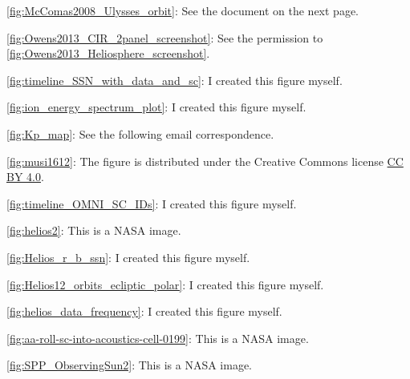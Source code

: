 \begin{itemize*}
	\item \autoref{fig:McComas2008_Ulysses_orbit}: See the document on the next page.
	
	\item \autoref{fig:Owens2013_CIR_2panel_screenshot}: See the permission to \autoref{fig:Owens2013_Heliosphere_screenshot}.

	\item \autoref{fig:timeline_SSN_with_data_and_sc}: I created this figure myself.
	\item \autoref{fig:ion_energy_spectrum_plot}: I created this figure myself.
	\item \autoref{fig:Kp_map}: See the following email correspondence.
	
	\item \autoref{fig:musi1612}: The figure is distributed under the Creative Commons license \href{https://creativecommons.org/licenses/by/4.0/}{CC BY 4.0}.
	\item \autoref{fig:timeline_OMNI_SC_IDs}: I created this figure myself.
	\item \autoref{fig:helios2}: This is a NASA image.
	\item \autoref{fig:Helios_r_b_ssn}: I created this figure myself.
	\item \autoref{fig:Helios12_orbits_ecliptic_polar}: I created this figure myself.
	\item \autoref{fig:helios_data_frequency}: I created this figure myself.





	\item \autoref{fig:aa-roll-sc-into-acoustics-cell-0199}: This is a NASA image.
	\item \autoref{fig:SPP_ObservingSun2}: This is a NASA image.





\end{itemize*}




